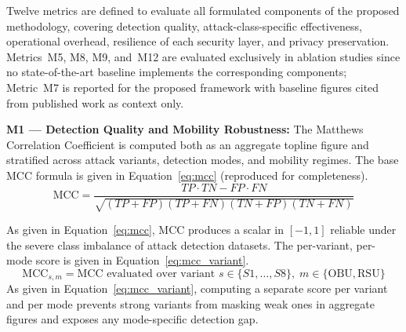 \documentclass[12pt, a4paper]{report}
\begin{document}
{{Twelve metrics are defined to evaluate all formulated
components of the proposed methodology, covering detection
quality, attack-class-specific effectiveness, operational
overhead, resilience of each security layer, and privacy
preservation. Metrics~M5, M8, M9, and~M12 are evaluated
exclusively in ablation studies since no state-of-the-art
baseline implements the corresponding components; Metric~M7
is reported for the proposed framework with baseline figures
cited from published work as context only.


\textbf{M1 — Detection Quality and Mobility Robustness:}
The Matthews Correlation Coefficient is computed both
as an aggregate topline figure and stratified across
attack variants, detection modes, and mobility regimes.
The base \ac{MCC} formula is given in
Equation~\eqref{eq:mcc} (reproduced for completeness).
\begin{equation}
\text{MCC} =
\frac{TP \cdot TN - FP \cdot FN}
{\sqrt{(TP{+}FP)(TP{+}FN)(TN{+}FP)(TN{+}FN)}}
\label{eq:mcc}
\end{equation}



As given in Equation~\eqref{eq:mcc}, MCC produces a
scalar in $[-1,1]$ reliable under the severe class
imbalance of attack detection datasets.
The per-variant, per-mode score is given in
Equation~\eqref{eq:mcc_variant}.
\begin{equation}
\text{MCC}_{s,m} = \text{MCC evaluated over variant }
s \in \{S1,\ldots,S8\},\;
m \in \{\text{OBU},\text{RSU}\}
\label{eq:mcc_variant}
\end{equation}
As given in Equation~\eqref{eq:mcc_variant}, computing
a separate score per variant and per mode prevents
strong variants from masking weak ones in aggregate
figures and exposes any mode-specific detection gap.

}}
\end{document}

